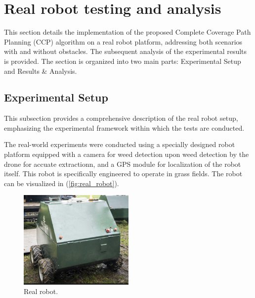 
\chapter{Real robot testing and analysis} 

This section details the implementation of the proposed Complete Coverage Path Planning (CCP) algorithm on a real robot platform, addressing both scenarios with and without obstacles. The subsequent analysis of the experimental results is provided. The section is organized into two main parts: Experimental Setup and Results \& Analysis. 

\section{Experimental Setup} 

This subsection provides a comprehensive description of the real robot setup, emphasizing the experimental framework within which the tests are conducted.   

\vspace{3mm}   


The real-world experiments were conducted using a specially designed robot platform equipped with a camera for weed detection upon weed detection by the drone for accuate extractionn, and a GPS module for localization of the robot itself. This robot is specifically engineered to operate in grass fields. The robot can be visualized in (\autoref{fig:real_robot}).   
\begin{figure}[htbp]
    \centering
    \includegraphics[width=0.5\textwidth]{Images/real_robot/robot.png}
    \caption{Real robot.}
    \label{fig:real_robot}
\end{figure}


\vspace{3mm}   


